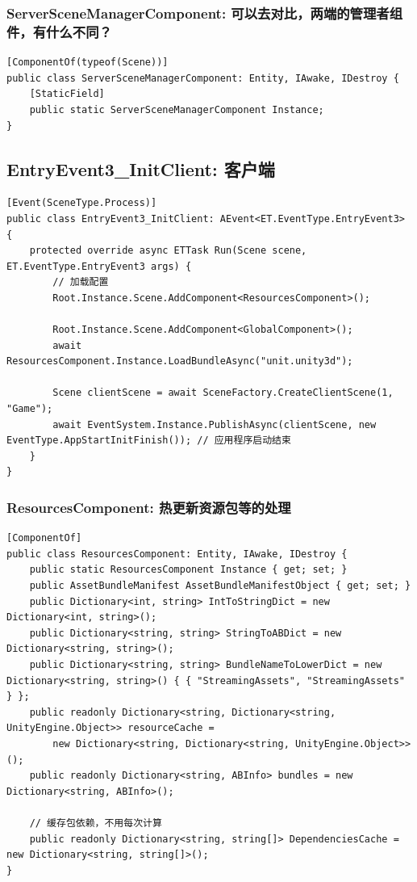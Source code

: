 \documentclass[9pt, b5paper]{article}
\begin{document}
\subsubsection{ServerSceneManagerComponent: 可以去对比，两端的管理者组件，有什么不同？}
\label{sec-1-4-5}
\begin{verbatim}
[ComponentOf(typeof(Scene))]
public class ServerSceneManagerComponent: Entity, IAwake, IDestroy {
    [StaticField]
    public static ServerSceneManagerComponent Instance;
}
\end{verbatim}
\subsection{EntryEvent3\_InitClient: 客户端}
\label{sec-1-5}
\begin{verbatim}
[Event(SceneType.Process)]
public class EntryEvent3_InitClient: AEvent<ET.EventType.EntryEvent3> {
    protected override async ETTask Run(Scene scene, ET.EventType.EntryEvent3 args) {
        // 加载配置
        Root.Instance.Scene.AddComponent<ResourcesComponent>();

        Root.Instance.Scene.AddComponent<GlobalComponent>();
        await ResourcesComponent.Instance.LoadBundleAsync("unit.unity3d");

        Scene clientScene = await SceneFactory.CreateClientScene(1, "Game");
        await EventSystem.Instance.PublishAsync(clientScene, new EventType.AppStartInitFinish()); // 应用程序启动结束 
    }
}
\end{verbatim}
\subsubsection{ResourcesComponent: 热更新资源包等的处理}
\label{sec-1-5-1}
\begin{verbatim}
[ComponentOf]
public class ResourcesComponent: Entity, IAwake, IDestroy {
    public static ResourcesComponent Instance { get; set; }
    public AssetBundleManifest AssetBundleManifestObject { get; set; }
    public Dictionary<int, string> IntToStringDict = new Dictionary<int, string>();
    public Dictionary<string, string> StringToABDict = new Dictionary<string, string>();
    public Dictionary<string, string> BundleNameToLowerDict = new Dictionary<string, string>() { { "StreamingAssets", "StreamingAssets" } };
    public readonly Dictionary<string, Dictionary<string, UnityEngine.Object>> resourceCache =
        new Dictionary<string, Dictionary<string, UnityEngine.Object>>();
    public readonly Dictionary<string, ABInfo> bundles = new Dictionary<string, ABInfo>();

    // 缓存包依赖，不用每次计算
    public readonly Dictionary<string, string[]> DependenciesCache = new Dictionary<string, string[]>();
}
\end{verbatim}
\end{document}
